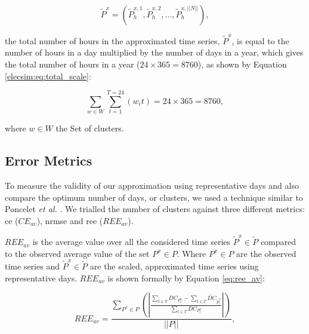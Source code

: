 \begin{equation}
\label{elecsim:eq:total_time_series}
\widetilde{P}^x=\left(\widetilde{P}^{x,1}_{h},\widetilde{P}^{x,2}_{h},\ldots, \widetilde{P}^{x,||N||}_{h}\right),
\end{equation}

\noindent the total number of hours in the approximated time series, $\widetilde{P}^x$, is equal to the number of hours in a day multiplied by the number of days in a year, which gives the total number of hours in a year ($24\times 365=8760$), as shown by Equation \ref{elecsim:eq:total_scale}:


\begin{equation}
\label{elecsim:eq:total_scale}
\sum\limits_{w\in W}\sum\limits_{t=1}^{T=24}\left(w_i t\right)=24\times 365=8760,
\end{equation}

\noindent where $w\in W$ the Set of clusters.

\subsection{Error Metrics}

To measure the validity of our approximation using representative days and also compare the optimum number of days, or clusters, we used a technique similar to Poncelet \textit{et al.} \cite{Dhaeseleer2015, Poncelet2017}. We trialled the number of clusters against three different metrics: \acrfull{ce} ($CE_{av}$), \acrfull{nrmse} and \acrfull{ree} ($REE_{av}$). 

$REE_{av}$ is the average value over all the considered time series $\widetilde{P}^x{\in} \widetilde{P}$ compared to the observed average value of the set $P^x\in P$. Where $P^x\in P$ are the observed time series and $\widetilde{P}^x{\in} \widetilde{P}$ are the scaled, approximated time series using representative days. $REE_{av}$ is shown formally by Equation \ref{eq:ree_av}:


\begin{equation}
\label{eq:ree_av}
REE_{av}=\frac
{\sum\limits_{P^x{\in} P}\left(\left|
	\frac
	{\sum\limits_{t\in T}DC_{P^x_t}-\sum\limits_{t\in T}\widetilde{DC}_{\widetilde{P}^x_t}}
	{\sum\limits_{t\in T}DC_{P^x_t}}
	\right|\right)
}
{\left|\left|P\right|\right|},
\end{equation}

